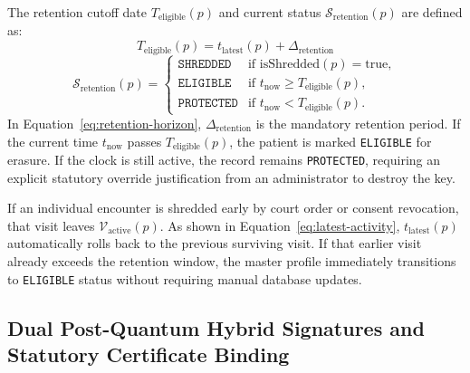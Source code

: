 The retention cutoff date $T_{\text{eligible}}(p)$ and current status $\mathcal{S}_{\text{retention}}(p)$ are defined as:
\begin{equation}
    T_{\text{eligible}}(p) = t_{\text{latest}}(p) + \Delta_{\text{retention}}
    \label{eq:retention-horizon}
\end{equation}
\begin{equation}
    \mathcal{S}_{\text{retention}}(p) = \begin{cases}
        \texttt{SHREDDED} & \text{if } \text{isShredded}(p) = \text{true}, \\
        \texttt{ELIGIBLE} & \text{if } t_{\text{now}} \ge T_{\text{eligible}}(p), \\
        \texttt{PROTECTED} & \text{if } t_{\text{now}} < T_{\text{eligible}}(p).
    \end{cases}
    \label{eq:retention-status}
\end{equation}
In Equation~\ref{eq:retention-horizon}, $\Delta_{\text{retention}}$ is the mandatory retention period. If the current time $t_{\text{now}}$ passes $T_{\text{eligible}}(p)$, the patient is marked \texttt{ELIGIBLE} for erasure. If the clock is still active, the record remains \texttt{PROTECTED}, requiring an explicit statutory override justification from an administrator to destroy the key.

If an individual encounter is shredded early by court order or consent revocation, that visit leaves $\mathcal{V}_{\text{active}}(p)$. As shown in Equation~\ref{eq:latest-activity}, $t_{\text{latest}}(p)$ automatically rolls back to the previous surviving visit. If that earlier visit already exceeds the retention window, the master profile immediately transitions to \texttt{ELIGIBLE} status without requiring manual database updates.

\subsection{Dual Post-Quantum Hybrid Signatures and Statutory Certificate Binding}

